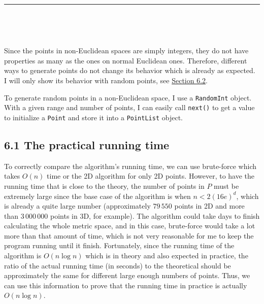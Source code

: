 \documentclass[12pt,english,]{article}
\newcommand{\code}[1]{\colorbox{light-gray}{\texttt{#1}}}
\let\origfigure\figure
\let\endorigfigure\endfigure
\renewenvironment{figure}[1][2] {
    \expandafter\origfigure\expandafter[H]
} {
    \endorigfigure
}
\begin{document}
\vspace{-2truemm}
\begin{figure}[!h]
\centering
{}

\caption{An example of points in a grid on a Euclidean space. A set of 40 points that gives us a $4\times10$ grid. Points are placed at corners of the squares whose sides are equal to $d$ that could be any number.}
\label{fig:grid}
\end{figure}

\hrule

~

~

Since the points in non-Euclidean spaces are simply integers, they do
not have properties as many as the ones on normal Euclidean ones.
Therefore, different ways to generate points do not change its behavior
which is already as expected. I will only show its behavior with random
points, see \protect\hyperlink{section6.2}{Section 6.2}.

To generate random points in a non-Euclidean space, I use a
\code{RandomInt} object. With a given range and number of points, I can
easily call \code{next()} to get a value to initialize a \code{Point}
and store it into a \code{PointList} object.

\hypertarget{the-practical-running-time}{%
\subsection{6.1 The practical running
time}\label{the-practical-running-time}}

To correctly compare the algorithm's running time, we can use
brute-force which takes \(O(n)\) time or the 2D algorithm for only 2D
points. However, to have the running time that is close to the theory,
the number of points in \(P\) must be extremely large since the base
case of the algorithm is when \(n < 2(16e)^d\), which is already a quite
large number (approximately \(79\,550\) points in 2D and more than
\(3\,000\,000\) points in 3D, for example). The algorithm could take
days to finish calculating the whole metric space, and in this case,
brute-force would take a lot more than that amount of time, which is not
very reasonable for me to keep the program running until it finish.
Fortunately, since the running time of the algorithm is \(O(n\log n)\)
which is in theory and also expected in practice, the ratio of the
actual running time (in seconds) to the theoretical should be
approximately the same for different large enough numbers of points.
Thus, we can use this information to prove that the running time in
practice is actually \(O(n\log n)\).
\end{document}
